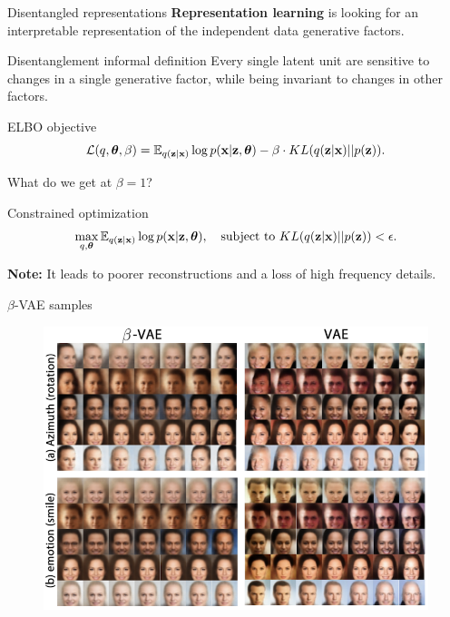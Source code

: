 \begin{frame}{Disentangled representations}
	\vspace{-0.2cm}
	\textbf{Representation learning} is looking for an interpretable representation of the independent data generative factors. 
	\begin{block}{Disentanglement informal definition}
		Every single latent unit are sensitive to changes in a single generative factor, while being invariant to changes in other factors. 
	\end{block}
	\vspace{-0.2cm}
	\begin{block}{ELBO objective}
		\vspace{-0.2cm}
		\[
		\mathcal{L}(q, \boldsymbol{\theta}, \beta) = \mathbb{E}_{q(\mathbf{z} | \mathbf{x})} \log p(\mathbf{x} | \mathbf{z}, \boldsymbol{\theta}) - \beta \cdot KL (q(\mathbf{z} | \mathbf{x}) || p(\mathbf{z})).
		\]
		\vspace{-0.5cm}
	\end{block}
	What do we get at $\beta = 1$? \\
	\begin{block}{Constrained optimization}
		\vspace{-0.7cm}
		\[
		\max_{q, \boldsymbol{\theta}} \mathbb{E}_{q(\mathbf{z} | \mathbf{x})} \log p(\mathbf{x} | \mathbf{z}, \boldsymbol{\theta}), \quad \text{subject to } KL (q(\mathbf{z} | \mathbf{x}) || p(\mathbf{z})) < \epsilon.
		\]
		\vspace{-0.7cm}
	\end{block}
	\textbf{Note:} It leads to poorer reconstructions and a loss of high frequency details. 
\end{frame}
\begin{frame}{$\beta$-VAE samples}
	\begin{figure}
		\centering
		\includegraphics[width=0.9\linewidth]{figs/betaVAE_1.png}
	\end{figure}
	
\end{frame}
